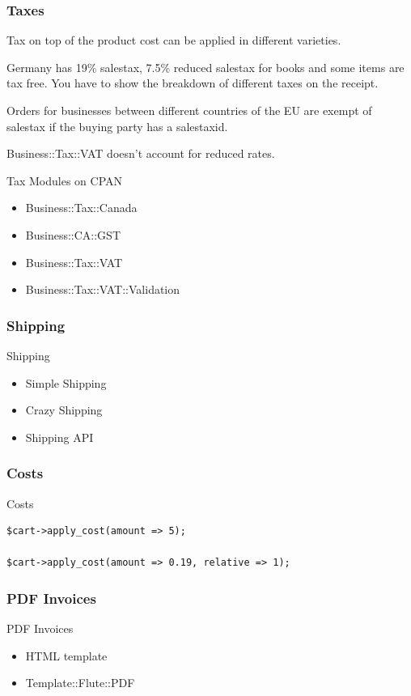 \subsubsection{Taxes}
Tax on top of the product cost can be applied in different varieties.

Germany has 19\% salestax, 7.5\% reduced salestax for books and some
items are tax free. You have to show the breakdown of different taxes
on the receipt.

Orders for businesses between different countries of the EU are exempt
of salestax if the buying party has a salestaxid.

Business::Tax::VAT doesn't account for reduced rates.

\begin{frame}{Tax Modules on CPAN}
\begin{itemize}
\item Business::Tax::Canada
\item Business::CA::GST
\item Business::Tax::VAT
\item Business::Tax::VAT::Validation
\end{itemize}
\end{frame}

\subsubsection{Shipping}
\begin{frame}{Shipping}
\begin{itemize}
\item Simple Shipping
\item Crazy Shipping
\item Shipping API
\end{itemize}
\end{frame}

\subsubsection{Costs}
\begin{frame}[fragile]{Costs}
\begin{lstlisting}
$cart->apply_cost(amount => 5);

$cart->apply_cost(amount => 0.19, relative => 1);
\end{lstlisting}
\end{frame}

\subsubsection{PDF Invoices}
\begin{frame}{PDF Invoices}
\begin{itemize}
\item HTML template
\item Template::Flute::PDF
\end{itemize}
\end{frame}

